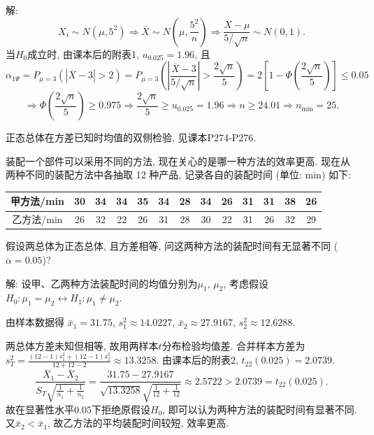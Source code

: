 \documentclass[standard]{ExBook}
\renewenvironment{shaded}{%
  \def\FrameCommand{\fboxsep=\FrameSep \colorbox{shadecolor}}%
  \MakeFramed{\advance\hsize-\width \FrameRestore}%
}{%
  \endMakeFramed
}
\begin{document}
\begin{qitems}
\vspace{\dimexpr2.5cm-5em\relax}

解:
$$
X_i\sim N(\mu,5^2)
\Longrightarrow
\overline{X}\sim N\left(\mu,\frac{5^2}{n}\right)
\Longrightarrow
\frac{\overline{X}-\mu}{5/\sqrt{n}}\sim N(0,1).
$$
当$H_0$成立时, 由课本后的附表1, $u_{0.025}=1.96$, 且
$$
\alpha_{1\Psi}
=P_{\mu=3}\left(|\overline{X}-3|>2\right)
=P_{\mu=3}\left(
\left|\frac{\overline{X}-3}{5/\sqrt{n}}\right|
>\frac{2\sqrt{n}}{5}
\right)
=2\left[1-\Phi\left(\frac{2\sqrt{n}}{5}\right)\right]
\leq0.05
$$
$$
\Longrightarrow
\Phi\left(\frac{2\sqrt{n}}{5}\right)\geq0.975
\Longrightarrow
\frac{2\sqrt{n}}{5}\geq u_{0.025}=1.96
\Longrightarrow
n\geq24.01
\Longrightarrow
n_{\min}=25.
$$

\textcolor{themeColor}{\selectfont {} 正态总体在方差已知时均值的双侧检验, 见课本P274-P276.}

\vspace{2.5cm-5em}

    \begin{bbox}
    \begin{shaded}
        \qitem
装配一个部件可以采用不同的方法, 现在关心的是哪一种方法的效率更高. 现在从两种不同的装配方法中各抽取 12 种产品, 记录各自的装配时间 (单位: min) 如下:
\begin{center}
\setlength{\tabcolsep}{10pt}
\begin{tabular}{c|cccccccccccc}
\hline
甲方法/min & 30 & 34 & 34 & 35 & 34 & 28 & 34 & 26 & 31 & 31 & 38 & 26 \\
\hline
乙方法/min & 26 & 32 & 22 & 26 & 31 & 28 & 30 & 22 & 31 & 26 & 32 & 29 \\
\hline
\end{tabular}
\end{center}
假设两总体为正态总体, 且方差相等, 问这两种方法的装配时间有无显著不同 ($\alpha=0.05$)?
    \end{shaded}
    \end{bbox}

\vspace{\dimexpr2.5cm-5em\relax}

解: 设甲、乙两种方法装配时间的均值分别为$\mu_1$, $\mu_2$, 考虑假设
$
H_0:\mu_1=\mu_2
\longleftrightarrow
H_1:\mu_1\neq\mu_2
$.

由样本数据得
$
\bar{x}_1=31.75
$,
$
s_1^2\approx14.0227
$,
$
\bar{x}_2\approx27.9167
$,
$
s_2^2\approx12.6288
$.

两总体方差未知但相等, 故用两样本$t$分布检验均值差. 合并样本方差为
$
s_T^2
=\frac{(12-1)s_1^2+(12-1)s_2^2}{12+12-2}
\approx13.3258
$.
由课本后的附表2, $t_{22}(0.025)=2.0739$.
$$
\frac{\overline{X}_1-\overline{X}_2}
{S_T\sqrt{\frac{1}{n_1}+\frac{1}{n_2}}}
=
\frac{31.75-27.9167}
{\sqrt{13.3258}\sqrt{\frac{1}{12}+\frac{1}{12}}}
\approx2.5722
>
2.0739
=
t_{22}(0.025).
$$
故在显著性水平$0.05$下拒绝原假设$H_0$, 即可以认为两种方法的装配时间有显著不同. 又$\bar{x}_2<\bar{x}_1$, 故乙方法的平均装配时间较短, 效率更高.


\end{qitems}
\end{document}

